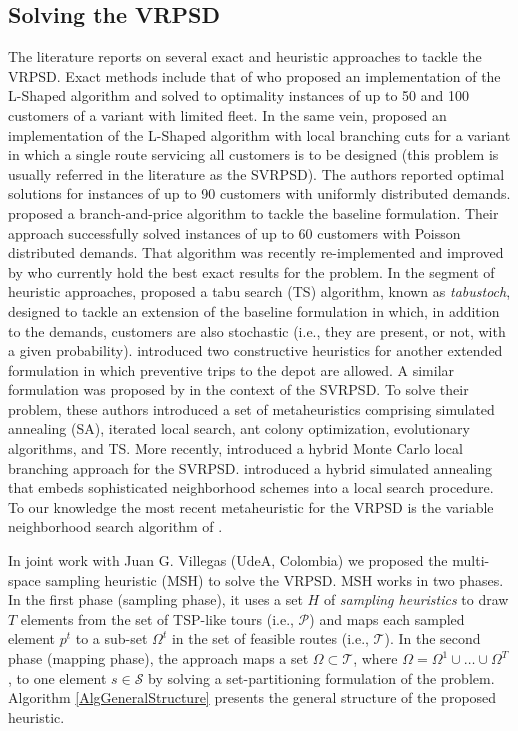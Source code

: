 \subsection{Solving the VRPSD}\label{s.vrpsd.msh}
The literature reports on several exact and heuristic approaches to tackle the VRPSD. Exact methods include that of \cite{Laporte2002a} who proposed an implementation of the L-Shaped algorithm and solved to optimality instances of up to 50 and 100 customers of a variant with limited fleet. In the same vein, \cite{Rei2007} proposed an implementation of the L-Shaped algorithm with local branching cuts for a variant in which a single route servicing all customers is to be designed (this problem is usually referred in the literature as the SVRPSD). The authors reported optimal solutions for instances of up to 90 customers with uniformly distributed demands. \cite{Christiansen2007} proposed a branch-and-price algorithm to tackle the baseline formulation. Their approach successfully solved instances of up to 60 customers with Poisson distributed demands. That algorithm was recently re-implemented and improved by \cite{Gauvin2014} who currently hold the best exact results for the problem. In the segment of heuristic approaches, \citet{Gendreau1996a} proposed a tabu search (TS) algorithm, known as \emph{tabustoch}, designed to tackle an extension of the baseline formulation in which, in addition to the demands, customers are also stochastic (i.e., they are present, or not, with a given probability). \citet{Yang2000} introduced two constructive heuristics for another extended formulation in which preventive trips to the depot are allowed. A similar formulation was proposed by \citet{Bianchi2006a} in the context of the SVRPSD. To solve their problem, these authors introduced a set of metaheuristics comprising simulated annealing (SA), iterated local search, ant colony optimization, evolutionary algorithms, and TS. More recently, \citet{Rei2010} introduced a hybrid Monte Carlo local branching approach for the SVRPSD. \citet{Goodson2012} introduced a hybrid simulated annealing that embeds sophisticated neighborhood schemes into a local search procedure. To our knowledge the most recent metaheuristic for the VRPSD is the variable neighborhood search algorithm of \cite{Sarasola2016}.

In joint work with Juan G. Villegas (UdeA, Colombia) we proposed the multi-space sampling heuristic (MSH) to solve the VRPSD. MSH works in two phases. In the first phase (sampling phase), it uses a set $H$ of \emph{sampling heuristics} to draw $T$ elements from the set of TSP-like tours (i.e., $\mathcal{P}$) and maps each sampled element $p^{t}$ to a sub-set $\Omega^t$ in the set of feasible routes (i.e., $\mathcal{T}$). In the second phase (mapping phase), the approach maps a set $\Omega\subset\mathcal{T}$, where $\Omega=\Omega^1\cup \ldots \cup \Omega^T$, to one element $s\in\mathcal{S}$ by solving a set-partitioning formulation of the problem. Algorithm \ref{AlgGeneralStructure} presents the general structure of the proposed heuristic.

